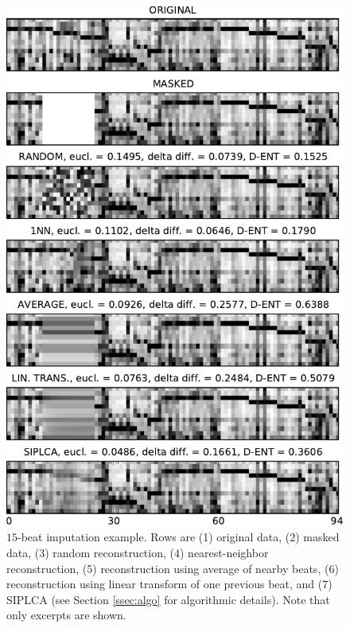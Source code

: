 \documentclass{article}
\begin{document}
\begin{figure}[t]
\begin{center}
\includegraphics[width=.99\columnwidth]{basic2}
\end{center}
\caption{$15$-beat imputation example.  Rows are (1) original data,
  (2) masked data, (3) random reconstruction, (4) nearest-neighbor
  reconstruction, (5) reconstruction using average of nearby beats, 
  (6) reconstruction using linear transform of one previous beat, 
  and (7) SIPLCA (see Section \ref{ssec:algo} for algorithmic details). 
  Note that only excerpts are shown.
  \label{fig:basic}}
\end{figure}

\end{document}

